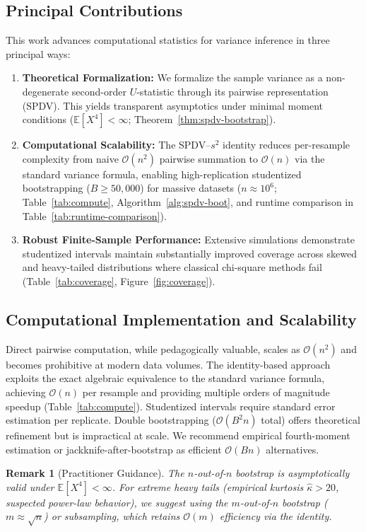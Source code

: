 \documentclass[12pt,a4paper]{article}
\newtheorem{remark}{Remark}
\begin{document}
\subsection{Principal Contributions}
This work advances computational statistics for variance inference in three principal ways:
\begin{enumerate}
    \item \textbf{Theoretical Formalization:} We formalize the sample variance as a non-degenerate second-order $U$-statistic through its pairwise representation (SPDV). This yields transparent asymptotics under minimal moment conditions ($\mathbb{E}[X^4]<\infty$; Theorem~\ref{thm:spdv-bootstrap}).
    \item \textbf{Computational Scalability:} The SPDV--$s^2$ identity reduces per-resample complexity from naive $\mathcal{O}(n^2)$ pairwise summation to $\mathcal{O}(n)$ via the standard variance formula, enabling high-replication studentized bootstrapping ($B \ge 50{,}000$) for massive datasets ($n \approx 10^6$; Table~\ref{tab:compute}, Algorithm~\ref{alg:spdv-boot}, and runtime comparison in Table~\ref{tab:runtime-comparison}).
    
    \item \textbf{Robust Finite-Sample Performance:} Extensive simulations demonstrate studentized intervals maintain substantially improved coverage across skewed and heavy-tailed distributions where classical chi-square methods fail (Table~\ref{tab:coverage}, Figure~\ref{fig:coverage}).
\end{enumerate}

\subsection{Computational Implementation and Scalability}
\label{sec:comp-discuss}
Direct pairwise computation, while pedagogically valuable, scales as $\mathcal{O}(n^2)$ and becomes prohibitive at modern data volumes. The identity-based approach exploits the exact algebraic equivalence to the standard variance formula, achieving $\mathcal{O}(n)$ per resample and providing multiple orders of magnitude speedup (Table~\ref{tab:compute}).
Studentized intervals require standard error estimation per replicate. Double bootstrapping ($\mathcal{O}(B^2 n)$ total) offers theoretical refinement but is impractical at scale. We recommend empirical fourth-moment estimation or jackknife-after-bootstrap as efficient $\mathcal{O}(Bn)$ alternatives.
\begin{remark}[Practitioner Guidance]
The $n$-out-of-$n$ bootstrap is asymptotically valid under $\mathbb{E}[X^4] < \infty$. For extreme heavy tails (empirical kurtosis $\hat{\kappa} > 20$, suspected power-law behavior), we suggest using the $m$-out-of-$n$ bootstrap ($m \approx \sqrt{n}$) or subsampling, which retains $\mathcal{O}(m)$ efficiency via the identity.
\end{remark}
\end{document}
